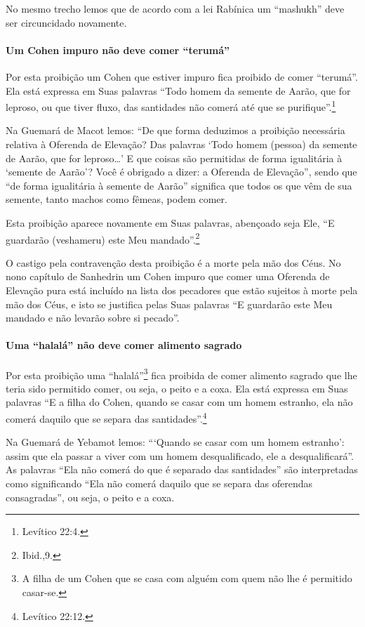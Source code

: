 No mesmo trecho lemos que de acordo com a lei Rabínica um ``mashukh''
deve ser circuncidado novamente.

\paragraph{Um Cohen impuro não deve comer ``terumá''}

Por esta proibição um Cohen que estiver impuro fica proibido de
comer ``terumá''. Ela está expressa em Suas palavras ``Todo homem da
semente de Aarão, que for leproso, ou que tiver fluxo, das santidades
não comerá até que se purifique''.\footnote{Levítico 22:4.}

Na Guemará de Macot lemos: ``De que forma deduzimos a proibição
necessária relativa à Oferenda de Elevação? Das palavras `Todo homem
(pessoa) da semente de Aarão, que for leproso\ldots{}' E que coisas são
permitidas de forma igualitária à `semente de Aarão'? Você é obrigado a
dizer: a Oferenda de Elevação'', sendo que ``de forma igualitária à
semente de Aarão'' significa que todos os que vêm de sua semente, tanto
machos como fêmeas, podem comer.

Esta proibição aparece novamente em Suas palavras, abençoado seja Ele,
``E guardarão (veshameru) este Meu mandado''.\footnote{Ibid.,9.}

O castigo pela contravenção desta proibição é a morte pela mão dos Céus.
No nono capítulo de Sanhedrin um Cohen impuro que comer uma Oferenda
de Elevação pura está incluído na lista dos pecadores que estão sujeitos
à morte pela mão dos Céus, e isto se justifica pelas Suas palavras ``E
guardarão este Meu mandado e não levarão sobre si pecado''.

\paragraph{Uma ``halalá'' não deve comer alimento sagrado}

Por esta proibição uma ``halalá''\footnote{A filha de um Cohen que se casa com alguém com quem não lhe é
  permitido casar-se.} fica proibida de
comer alimento sagrado que lhe teria sido permitido comer, ou seja, o
peito e a coxa. Ela está expressa em Suas palavras ``E a filha do
Cohen, quando se casar com um homem estranho, ela não comerá daquilo
que se separa das santidades''.\footnote{Levítico 22:12.}

Na Guemará de Yebamot lemos: ```Quando se casar com um homem estranho':
assim que ela passar a viver com um homem desqualificado, ele a
desqualificará''. As palavras ``Ela não comerá do que é separado das
santidades'' são interpretadas como significando ``Ela não comerá
daquilo que se separa das oferendas consagradas'', ou seja, o peito e a
coxa.

